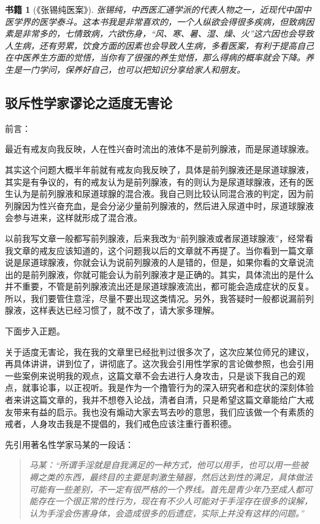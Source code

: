\documentclass[fontset=founder]{ctexart}
\newtheorem{book}{书籍}
\begin{document}
\begin{book}[《张锡纯医案》]
    张锡纯，中西医汇通学派的代表人物之一，近现代中国中医学界的医学泰斗。这本书我是非常喜欢的，一个人纵欲会得很多疾病，但致病因素是非常多的，七情致病，六欲伤身，“风、寒、暑、湿、燥、火”这六因也会导致人生病，还有劳累，饮食方面的因素也会导致人生病，多看医案，有利于提高自己在中医养生方面的觉悟，当你有了很强的养生觉悟，那么得病的概率就会下降。养生是一门学问，保养好自己，也可以把知识分享给家人和朋友。
\end{book}

\subsection{驳斥性学家谬论之适度无害论}

前言：

最近有戒友向我反映，人在性兴奋时流出的液体不是前列腺液，而是尿道球腺液。

其实这个问题大概半年前就有戒友向我反映了，具体是前列腺液还是尿道球腺液，其实是有争议的，有的戒友认为是前列腺液，有的则认为是尿道球腺液，还有的医生认为是前列腺液和尿道球腺的混合液。我自己则比较认同混合液的判定，因为前列腺因为性兴奋充血，是会分泌少量前列腺液的，然后进入尿道中时，尿道球腺液会参与进来，这样就形成了混合液。

以前我写文章一般都写前列腺液，后来我改为“前列腺液或者尿道球腺液”，经常看我文章的戒友应该知道的，这个问题我以后的文章就不再提了。当你看到一篇文章说是尿道球腺液，你就会认为说前列腺液的人是错的，但是，如果你看的文章说流出的是前列腺液，你就可能会认为前列腺液才是正确的。其实，具体流出的是什么并不重要，不管是前列腺液流出还是尿道球腺液流出，都可能会造成症状的反复。所以，我们要管住意淫，尽量不要出现这类情况。另外，我答疑时一般都说漏前列腺液，这样表达已经习惯了，就不改了，请大家多理解。

下面步入正题。

关于适度无害论，我在我的文章里已经批判过很多次了，这次应某位师兄的建议，再具体讲讲，讲到位了，讲彻底了。这次我会引用性学家的言论做参照，也会引用一些案例来说明我的观点，这篇文章不会去进行人身攻击，只是谈下我自己的观点，就事论事，以正视听。我是作为一个撸管行为的深入研究者和症状的深刻体验者来讲这篇文章的，我并不想卷入论战，清者自清，只是希望这篇文章能给广大戒友带来有益的启示。我也没有煽动大家去骂去吵的意思，我们应该做一个有素质的戒者，人身攻击我是不提倡的，我们戒色应该注重行善积德。

先引用著名性学家马某的一段话：

\begin{quote}\it
    马某：“所谓手淫就是自我满足的一种方式，他可以用手，也可以用一些被褥之类的东西，最终目的主要是刺激生殖器，然后达到性的满足，具体做法可能有一些差别，不一定有很严格的一个界线。首先是青少年乃至成人都可能存在一个很正常的性行为，现在有不少人可能对于手淫存在很多的误解，认为手淫会伤害身体，会造成很多的后遗症，实际上并没有这样的问题。”
\end{quote}
\end{document}
